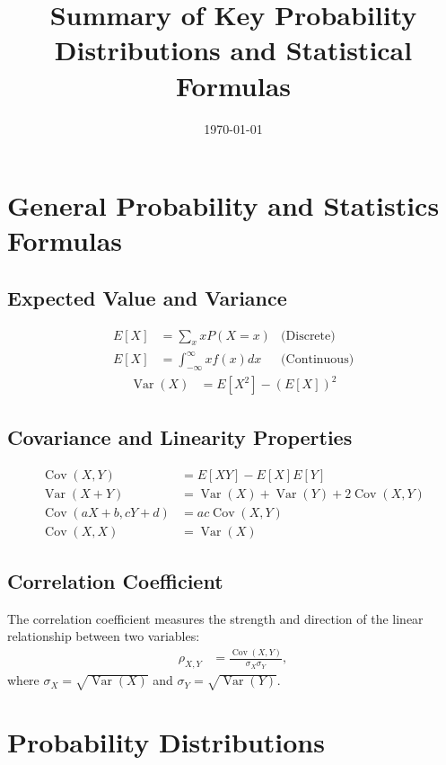 \documentclass[12pt]{article}
\title{Summary of Key Probability Distributions and Statistical Formulas}
\author{}
\date{\today}
\begin{document}
\maketitle

\tableofcontents
\newpage

\section{General Probability and Statistics Formulas}

\subsection{Expected Value and Variance}
\begin{align*}
    E[X] &= \sum_{x} x P(X = x) &\text{(Discrete)} \\
    E[X] &= \int_{-\infty}^{\infty} x f(x) dx &\text{(Continuous)}
\end{align*}
\begin{align*}
    \operatorname{Var}(X) &= E[X^2] - (E[X])^2
\end{align*}

\subsection{Covariance and Linearity Properties}
\begin{align*}
    \operatorname{Cov}(X, Y) &= E[XY] - E[X]E[Y] \\
    \operatorname{Var}(X + Y) &= \operatorname{Var}(X) + \operatorname{Var}(Y) + 2\operatorname{Cov}(X,Y) \\
    \operatorname{Cov}(aX + b, cY + d) &= ac \operatorname{Cov}(X, Y) \\
    \operatorname{Cov}(X, X) &= \operatorname{Var}(X)
\end{align*}

\subsection{Correlation Coefficient}
The correlation coefficient measures the strength and direction of the linear relationship between two variables:
\begin{align*}
    \rho_{X,Y} &= \frac{\operatorname{Cov}(X, Y)}{\sigma_X \sigma_Y},
\end{align*}
where $\sigma_X = \sqrt{\operatorname{Var}(X)}$ and $\sigma_Y = \sqrt{\operatorname{Var}(Y)}$.

\section{Probability Distributions}
\end{document}

